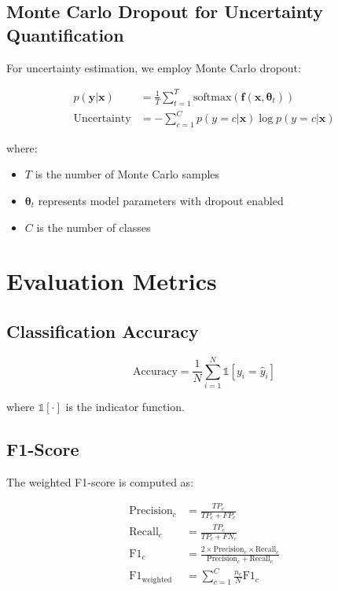 \documentclass[12pt]{article}
\newcommand{\vecbf}[1]{\mathbf{#1}}
\newcommand{\softmax}{\text{softmax}}
\begin{document}
\subsection{Monte Carlo Dropout for Uncertainty Quantification}

For uncertainty estimation, we employ Monte Carlo dropout:

\begin{align}
p(\vecbf{y}|\vecbf{x}) &= \frac{1}{T} \sum_{t=1}^{T} \softmax(\vecbf{f}(\vecbf{x}, \boldsymbol{\theta}_t)) \\
\text{Uncertainty} &= -\sum_{c=1}^{C} p(y=c|\vecbf{x}) \log p(y=c|\vecbf{x})
\end{align}

where:
\begin{itemize}
    \item $T$ is the number of Monte Carlo samples
    \item $\boldsymbol{\theta}_t$ represents model parameters with dropout enabled
    \item $C$ is the number of classes
\end{itemize}

\section{Evaluation Metrics}

\subsection{Classification Accuracy}

\begin{equation}
\text{Accuracy} = \frac{1}{N} \sum_{i=1}^{N} \mathbb{1}[y_i = \hat{y}_i]
\end{equation}

where $\mathbb{1}[\cdot]$ is the indicator function.

\subsection{F1-Score}

The weighted F1-score is computed as:

\begin{align}
\text{Precision}_c &= \frac{TP_c}{TP_c + FP_c} \\
\text{Recall}_c &= \frac{TP_c}{TP_c + FN_c} \\
\text{F1}_c &= \frac{2 \times \text{Precision}_c \times \text{Recall}_c}{\text{Precision}_c + \text{Recall}_c} \\
\text{F1}_{\text{weighted}} &= \sum_{c=1}^{C} \frac{n_c}{N} \text{F1}_c
\end{align}
\end{document}
